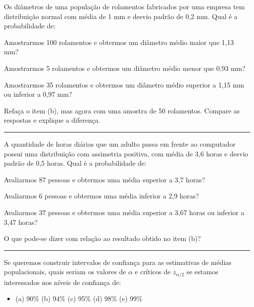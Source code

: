 \documentclass[a4paper,11pt,fleqn]{article}\usepackage[]{graphicx}\usepackage[]{color}
\theoremstyle{definition}
\begin{document}
\begin{compactenum}[1.]
\item Os diâmetros de uma população de rolamentos fabricados por uma
  empresa tem distribuição normal com média de 1 mm e desvio padrão de
  0,2 mm. Qual é a probabilidade de:
  \begin{compactenum}
  \item Amostrarmos 100 rolamentos e obtermos um diâmetro médio maior
    que 1,13 mm?
  \item Amostrarmos 5 rolamentos e obtermos um diâmetro médio menor que 0,93
    mm?
  \item Amostrarmos 35 rolamentos e obtermos um diâmetro médio superior
    a 1,15 mm ou inferior a 0,97 mm?
  \item Refaça o item (b), mas agora com uma amostra de 50
    rolamentos. Compare as respostas e explique a diferença.
  \end{compactenum}
\end{compactenum}

\vspace{0.3cm}
\hrule
\vspace{0.3cm}

\begin{compactenum}[2.]
\item A quantidade de horas diárias que um adulto passa em frente ao
  computador possui uma distribuição com assimetria positiva, com média
  de 3,6 horas e desvio padrão de 0,5 horas. Qual é a probabilidade de:
  \begin{compactenum}
  \item Avaliarmos 87 pessoas e obtermos uma média superior a 3,7
    horas?
  \item Avaliarmos 6 pessoas e obtermos uma média inferior a 2,9 horas?
  \item Avaliarmos 37 pessoas e obtermos uma média superior a 3,67
    horas ou inferior a 3,47 horas?
  \item O que pode-se dizer com relação ao resultado obtido no item (b)?
  \end{compactenum}
\end{compactenum}

\vspace{0.3cm}
\hrule
\vspace{0.3cm}

\begin{compactenum}[3.]
\item Se queremos construir intervalos de confiança para as estimativas
  de médias populacionais, quais seriam os valores de $\alpha$ e
  críticos de $z_{\alpha/2}$ se estamos interessados nos níveis de
  confiança de:
  \begin{itemize}
  \item[] (a) 90\% \qquad (b) 94\% \qquad (c) 95\% \qquad (d) 98\%
    \qquad (e) 99\%
  \end{itemize}
\end{compactenum}
\end{document}
